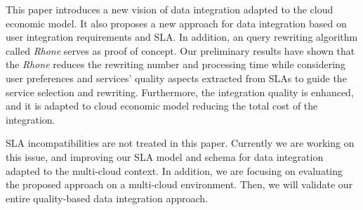 This paper introduces a new vision of data integration adapted to the cloud economic model. It also proposes a new approach for data integration based on user integration requirements and SLA. In addition, an query rewriting algorithm called \textit{Rhone} serves as proof of concept. Our preliminary results have shown that the \textit{Rhone} reduces the rewriting number and processing time while considering user preferences and services' quality aspects extracted from SLAs to guide the service selection and rewriting. Furthermore, the integration quality is enhanced, and it is adapted to cloud economic model reducing the total cost of the integration.

SLA incompatibilities are not treated in this paper. Currently we are working on this issue, and improving our SLA model and schema for data integration adapted to the multi-cloud context.  In addition, we are focusing on evaluating the proposed approach on a multi-cloud environment. Then, we will validate our entire quality-based data integration approach.

